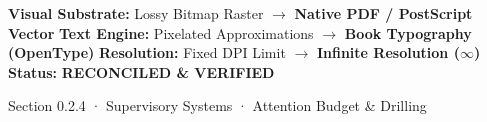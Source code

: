 \documentclass[10pt,a4paper,landscape]{article}
\begin{document}
\vspace*{0.05cm}
\noindent
\begin{tcolorbox}[
  colback=hhpaper,colframe=hhgray!35,arc=1.5pt,boxrule=0.4pt,
  top=1.5pt,bottom=1.5pt,left=6pt,right=6pt
]
  \pdgrotesk\scriptsize
  \noindent
  \textbf{Visual Substrate:} Lossy Bitmap Raster $\rightarrow$ \textbf{\color{pdcobalt}Native PDF / PostScript Vector}\hfill
  \textbf{Text Engine:} Pixelated Approximations $\rightarrow$ \textbf{\color{pdcobalt}Book Typography (OpenType)}\hfill
  \textbf{Resolution:} Fixed DPI Limit $\rightarrow$ \textbf{\color{pdcobalt}Infinite Resolution ($\infty$)}\hfill
  \textbf{Status:} \textbf{\color{pdteal}RECONCILED \& VERIFIED}
\end{tcolorbox}
\clearpage

\noindent
\begin{minipage}[t]{\linewidth}
  \hfill
  {\pdgrotesk\footnotesize\color{hhgray} Section 0.2.4 · Supervisory Systems · Attention Budget \& Drilling}\\
  \vspace*{0.03cm}
  \noindent{\color{hhgray!40}\rule{\linewidth}{0.5pt}}
\end{minipage}
\end{document}
